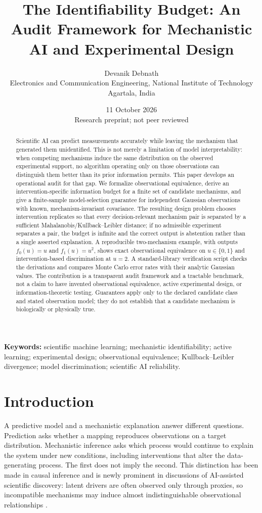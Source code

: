\documentclass[11pt]{article}
\title{\textbf{The Identifiability Budget: An Audit Framework for Mechanistic AI and Experimental Design}}
\author{Devanik Debnath\\\small Electronics and Communication Engineering, National Institute of Technology Agartala, India}
\date{11 October 2026 \\ \small Research preprint; not peer reviewed}
\begin{document}
\maketitle
\begin{abstract}
Scientific AI can predict measurements accurately while leaving the mechanism that generated them unidentified. This is not merely a limitation of model interpretability: when competing mechanisms induce the same distribution on the observed experimental support, no algorithm operating only on those observations can distinguish them better than its prior information permits. This paper develops an operational audit for that gap. We formalize observational equivalence, derive an intervention-specific information budget for a finite set of candidate mechanisms, and give a finite-sample model-selection guarantee for independent Gaussian observations with known, mechanism-invariant covariance. The resulting design problem chooses intervention replicates so that every decision-relevant mechanism pair is separated by a sufficient Mahalanobis/Kullback--Leibler distance; if no admissible experiment separates a pair, the budget is infinite and the correct output is abstention rather than a single asserted explanation. A reproducible two-mechanism example, with outputs $f_0(u)=u$ and $f_1(u)=u^2$, shows exact observational equivalence on $u\in\{0,1\}$ and intervention-based discrimination at $u=2$. A standard-library verification script checks the derivations and compares Monte Carlo error rates with their analytic Gaussian values. The contribution is a transparent audit framework and a tractable benchmark, not a claim to have invented observational equivalence, active experimental design, or information-theoretic testing. Guarantees apply only to the declared candidate class and stated observation model; they do not establish that a candidate mechanism is biologically or physically true.
\end{abstract}
\textbf{Keywords:} scientific machine learning; mechanistic identifiability; active learning; experimental design; observational equivalence; Kullback--Leibler divergence; model discrimination; scientific AI reliability.

\section{Introduction}
A predictive model and a mechanistic explanation answer different questions. Prediction asks whether a mapping reproduces observations on a target distribution. Mechanistic inference asks which process would continue to explain the system under new conditions, including interventions that alter the data-generating process. The first does not imply the second. This distinction has been made in causal inference and is newly prominent in discussions of AI-assisted scientific discovery: latent drivers are often observed only through proxies, so incompatible mechanisms may induce almost indistinguishable observational relationships \citep{pearl2009,mccormick2026}.
\end{document}
